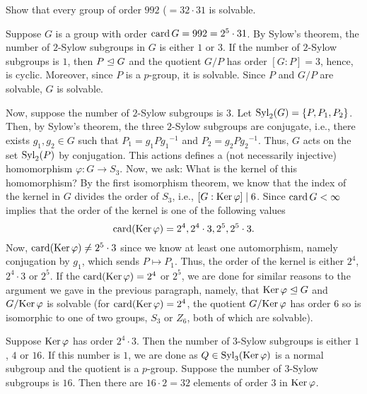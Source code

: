 \begin{problem}
  Show that every group of order \(992\) (\(=32\cdot 31\) is solvable.
\end{problem}
\begin{solution}
  Suppose \(G\) is a group with order \(\operatorname{card} G=992=2^5\cdot 31\). By
  Sylow's theorem, the number of \(2\)-Sylow subgroups in \(G\) is either
  \(1\) or \(3\). If the number of \(2\)-Sylow subgroups is \(1\), then
  \(P\trianglelefteq G\) and the quotient \(G/P\) has order \([G:P]=3\), hence, is
  cyclic. Moreover, since \(P\) is a \(p\)-group, it is solvable. Since
  \(P\) and \(G/P\) are solvable, \(G\) is solvable.

  Now, suppose the number of \(2\)-Sylow subgroups is \(3\). Let
  \(\operatorname{Syl}_2(G)=\{P,P_1,P_2\}\). Then, by Sylow's theorem, the three
  \(2\)-Sylow subgroups are conjugate, i.e., there exists \(g_1,g_2\in G\)
  such that \(P_1=g_1P{g_1}^{-1}\) and \(P_2=g_2P{g_2}^{-1}\). Thus, \(G\)
  acts on the set \(\operatorname{Syl}_2(P)\) by conjugation. This actions defines a (not
  necessarily injective) homomorphism \(\varphi\colon G\to S_3\). Now, we
  ask: What is the kernel of this homomorphism? By the first isomorphism
  theorem, we know that the index of the kernel in \(G\) divides the order
  of \(S_3\), i.e., \([G:{\operatorname{Ker}\varphi}]\mid 6\). Since \(\operatorname{card} G<\infty\)
  implies that the order of the kernel is one of the following values
  \[
    \operatorname{card}(\operatorname{Ker}\varphi)=2^4,2^4\cdot 3,2^5,2^5\cdot 3.
  \]
  Now, \(\operatorname{card}(\operatorname{Ker}\varphi)\neq 2^5\cdot 3\) since we know at least one
  automorphism, namely conjugation by \(g_1\), which sends
  \(P\mapsto P_1\). Thus, the order of the kernel is either \(2^4\),
  \(2^4\cdot 3\) or \(2^5\). If the \(\operatorname{card}(\operatorname{Ker}\varphi)=2^4\) or \(2^5\),
  we are done for similar reasons to the argument we gave in the previous
  paragraph, namely, that \(\operatorname{Ker}\varphi\trianglelefteq G\) and \(G/{\operatorname{Ker}\varphi}\)
  is solvable (for \(\operatorname{card}(\operatorname{Ker}\varphi)=2^4\), the quotient
  \(G/{\operatorname{Ker}\varphi}\) has order \(6\) so is isomorphic to one of two
  groups, \(S_3\) or \(Z_6\), both of which are solvable).

  Suppose \(\operatorname{Ker}\varphi\) has order \(2^4\cdot 3\). Then the number of
  \(3\)-Sylow subgroups is either \(1\), \(4\) or \(16\). If this number is
  \(1\), we are done as \(Q\in \operatorname{Syl}_3({\operatorname{Ker}\varphi})\) is a normal subgroup
  and the quotient is a \(p\)-group. Suppose the number of \(3\)-Sylow
  subgroups is \(16\). Then there are \(16\cdot 2=32\) elements of order
  \(3\) in \(\operatorname{Ker}\varphi\).
\end{solution}

